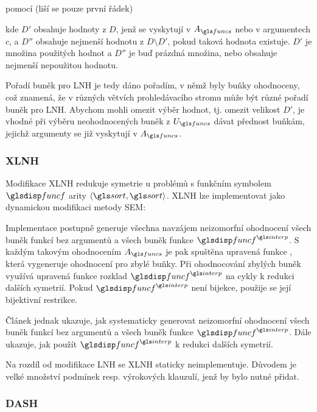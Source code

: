 \noindent pomocí (liší se pouze první řádek)

\medskip
\begin{algorithmic}
    \State {}
  \EndFor
\end{algorithmic}
\medskip

\noindent
kde $D'$ obsahuje hodnoty z $D$, jenž se vyskytují v $A_\funcs$ nebo
v argumentech $c$,
a $D''$ obsahuje nejmenší hodnotu z $D \setminus D'$,
pokud taková hodnota existuje.
$D'$ je množina použitých hodnot a $D''$ je buď prázdná množina,
nebo obsahuje nejmenší nepoužitou hodnotu.

Pořadí buněk pro LNH je tedy dáno pořadím, v němž byly
buňky ohodnoceny, což znamená, že v různých větvích
prohledávacího stromu může být různé pořadí buněk pro LNH.
Abychom mohli omezit výběr hodnot, tj. omezit velikost $D'$,
je vhodné při výběru neohodnocených buněk z $U_\funcs$
dávat přednost buňkám, jejichž argumenty se již vyskytují v $A_\funcs$.


\subsubsection{XLNH}

Modifikace XLNH \cite{xlnh} redukuje symetrie u problémů
s funkčním symbolem $\func$ arity $\langle \sort, \sort \rangle$.
XLNH lze implementovat jako dynamickou modifikaci metody SEM:

Implementace postupně generuje všechna navzájem
neizomorfní ohodnocení všech buněk
funkcí bez argumentů a všech buněk funkce $\func^\interp$.
S každým takovým ohodnocením $A_\funcs$ je pak spuštěna upravená funkce
, která vygeneruje ohodnocení pro zbylé buňky.
Při ohodnocování zbylých buněk využívá upravená funkce 
rozklad $\func^\interp$ na cykly
k redukci dalších symetrií. Pokud $\func^\interp$ není bijekce,
použije se její bijektivní restrikce.

Článek \cite{xlnh} jednak ukazuje, jak systematicky
generovat neizomorfní ohodnocení všech buněk
funkcí bez argumentů a všech buněk funkce $\func^\interp$.
Dále ukazuje, jak použít $\func^\interp$ k redukci dalších symetrií.

Na rozdíl od modifikace LNH se XLNH staticky neimplementuje.
Důvodem je velké množství podmínek resp. výrokových klauzulí,
jenž by bylo nutné přidat.

\subsubsection{DASH}

